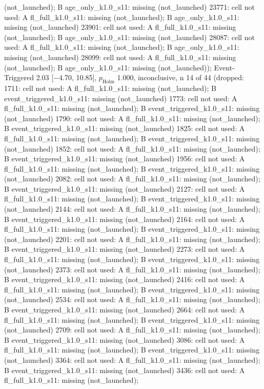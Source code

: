 \begin{table}[t]
{(not\_launched); B age\_only\_k1.0\_s11: missing (not\_launched) \textbar{} 23771: cell not used: A fl\_full\_k1.0\_s11: missing (not\_launched); B age\_only\_k1.0\_s11: missing (not\_launched) \textbar{} 23901: cell not used: A fl\_full\_k1.0\_s11: missing (not\_launched); B age\_only\_k1.0\_s11: missing (not\_launched) \textbar{} 28087: cell not used: A fl\_full\_k1.0\_s11: missing (not\_launched); B age\_only\_k1.0\_s11: missing (not\_launched) \textbar{} 28099: cell not used: A fl\_full\_k1.0\_s11: missing (not\_launched); B age\_only\_k1.0\_s11: missing (not\_launched)); Event-Triggered 2.03 [$-$4.70, 10.85], $p_\mathrm{Holm}$ 1.000, inconclusive, n 14 of 44 (dropped: 1711: cell not used: A fl\_full\_k1.0\_s11: missing (not\_launched); B event\_triggered\_k1.0\_s11: missing (not\_launched) \textbar{} 1773: cell not used: A fl\_full\_k1.0\_s11: missing (not\_launched); B event\_triggered\_k1.0\_s11: missing (not\_launched) \textbar{} 1790: cell not used: A fl\_full\_k1.0\_s11: missing (not\_launched); B event\_triggered\_k1.0\_s11: missing (not\_launched) \textbar{} 1825: cell not used: A fl\_full\_k1.0\_s11: missing (not\_launched); B event\_triggered\_k1.0\_s11: missing (not\_launched) \textbar{} 1852: cell not used: A fl\_full\_k1.0\_s11: missing (not\_launched); B event\_triggered\_k1.0\_s11: missing (not\_launched) \textbar{} 1956: cell not used: A fl\_full\_k1.0\_s11: missing (not\_launched); B event\_triggered\_k1.0\_s11: missing (not\_launched) \textbar{} 2082: cell not used: A fl\_full\_k1.0\_s11: missing (not\_launched); B event\_triggered\_k1.0\_s11: missing (not\_launched) \textbar{} 2127: cell not used: A fl\_full\_k1.0\_s11: missing (not\_launched); B event\_triggered\_k1.0\_s11: missing (not\_launched) \textbar{} 2144: cell not used: A fl\_full\_k1.0\_s11: missing (not\_launched); B event\_triggered\_k1.0\_s11: missing (not\_launched) \textbar{} 2164: cell not used: A fl\_full\_k1.0\_s11: missing (not\_launched); B event\_triggered\_k1.0\_s11: missing (not\_launched) \textbar{} 2201: cell not used: A fl\_full\_k1.0\_s11: missing (not\_launched); B event\_triggered\_k1.0\_s11: missing (not\_launched) \textbar{} 2273: cell not used: A fl\_full\_k1.0\_s11: missing (not\_launched); B event\_triggered\_k1.0\_s11: missing (not\_launched) \textbar{} 2373: cell not used: A fl\_full\_k1.0\_s11: missing (not\_launched); B event\_triggered\_k1.0\_s11: missing (not\_launched) \textbar{} 2416: cell not used: A fl\_full\_k1.0\_s11: missing (not\_launched); B event\_triggered\_k1.0\_s11: missing (not\_launched) \textbar{} 2534: cell not used: A fl\_full\_k1.0\_s11: missing (not\_launched); B event\_triggered\_k1.0\_s11: missing (not\_launched) \textbar{} 2664: cell not used: A fl\_full\_k1.0\_s11: missing (not\_launched); B event\_triggered\_k1.0\_s11: missing (not\_launched) \textbar{} 2709: cell not used: A fl\_full\_k1.0\_s11: missing (not\_launched); B event\_triggered\_k1.0\_s11: missing (not\_launched) \textbar{} 3086: cell not used: A fl\_full\_k1.0\_s11: missing (not\_launched); B event\_triggered\_k1.0\_s11: missing (not\_launched) \textbar{} 3364: cell not used: A fl\_full\_k1.0\_s11: missing (not\_launched); B event\_triggered\_k1.0\_s11: missing (not\_launched) \textbar{} 3436: cell not used: A fl\_full\_k1.0\_s11: missing (not\_launched); }
\end{table}

